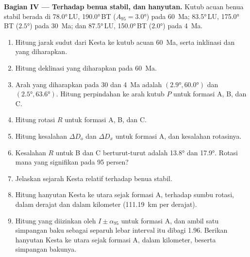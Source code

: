 \begin{problem}
\medskip\noindent\textbf{Bagian IV --- Terhadap benua stabil, dan hanyutan.} Kutub acuan
benua stabil berada di \ang{78.0}\,LU, \ang{190.0}\,BT
($A_{95} = \ang{3.0}$) pada \qty{60}{Ma}; \ang{83.5}\,LU, \ang{175.0}\,BT
($\ang{2.5}$) pada \qty{30}{Ma}; dan \ang{87.5}\,LU, \ang{150.0}\,BT ($\ang{2.0}$)
pada \qty{4}{Ma}.
\begin{enumerate}[resume]
  \item Hitung jarak sudut dari Kesta ke kutub acuan
        \qty{60}{Ma}, serta inklinasi dan  yang diharapkan.
  \item Hitung deklinasi yang diharapkan pada \qty{60}{Ma}.
  \item Arah yang diharapkan pada 30 dan \qty{4}{Ma} adalah $(\ang{2.9},
        \ang{60.0})$ dan $(\ang{2.5}, \ang{63.6})$. Hitung perpindahan ke arah
        kutub $P$ untuk formasi A, B, dan C.
  \item Hitung rotasi $R$ untuk formasi A, B, dan C.
  \item Hitung kesalahan $\Delta D_o$ dan $\Delta D_x$ untuk formasi A, dan
        kesalahan rotasinya.
  \item Kesalahan $R$ untuk B dan C berturut-turut adalah \ang{13.8} dan \ang{17.9}. Rotasi mana
        yang signifikan pada 95 persen?
  \item Jelaskan sejarah Kesta relatif terhadap benua stabil.
  \item Hitung hanyutan Kesta ke utara sejak formasi A, terhadap
        sumbu rotasi, dalam derajat dan dalam kilometer
        (\qty{111.19}{km} per derajat).
  \item Hitung  yang diizinkan oleh $I \pm \alpha_{95}$ untuk
        formasi A, dan ambil satu simpangan baku sebagai separuh lebar interval itu
        dibagi 1.96. Berikan hanyutan Kesta ke utara sejak formasi
        A, dalam kilometer, beserta simpangan bakunya.
\end{enumerate}
\end{problem}
